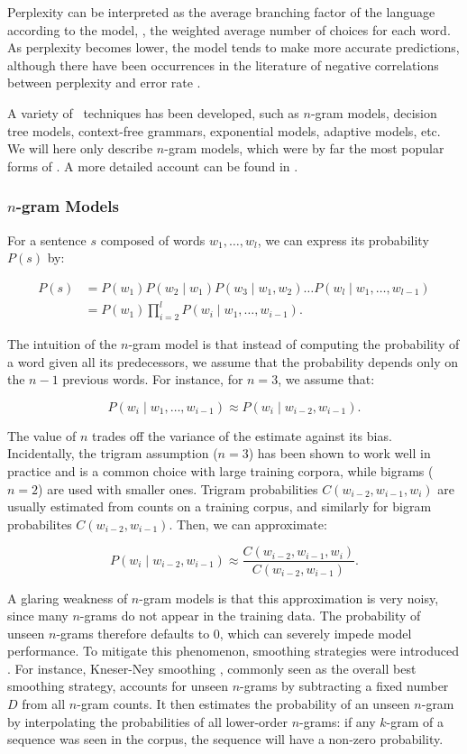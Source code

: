 Perplexity can be interpreted as the average branching factor of the language according to the model, \ie, the weighted average number of choices for each word. As perplexity becomes lower, the model tends to make more accurate predictions, although there have been occurrences in the literature of negative correlations between perplexity and error rate \citep{chen1998evaluation}.

A variety of \slm\ techniques has been developed, such as $n$-gram models, decision tree models, context-free grammars, exponential models, adaptive models, etc. We will here only describe $n$-gram models, which were by far the most popular forms of \slm . A more detailed account can be found in \citet{rosenfeld2000two}. 

\subsubsection{$n$-gram Models}
For a sentence $s$ composed of words $w_1, \dots, w_l$, we can express its probability $P(s)$ by:

\begin{align*}
    P(s)    & = P(w_1) P(w_2 \mid w_1) P(w_3 \mid w_1, w_2) \dots P(w_l \mid w_1, \dots, w_{l-1}) \\
            & = P(w_1) \prod_{i=2}^l P(w_i \mid w_1, \dots, w_{i-1}) .
\end{align*}

The intuition of the $n$-gram model is that instead of computing the probability of a word given all its predecessors, we assume that the probability depends only on the $n-1$ previous words. For instance, for $n=3$, we assume that:

\[ P(w_i \mid w_1, \dots, w_{i-1}) \approx P(w_i \mid w_{i-2}, w_{i-1}) . \]

The value of $n$ trades off the variance of the estimate against its bias. Incidentally, the trigram assumption ($n=3$) has been shown to work well in practice \citep{goodman2001bit} and is a common choice with large training corpora, while bigrams ($n=2$) are used with smaller ones. Trigram probabilities $C(w_{i-2}, w_{i-1}, w_i)$ are usually estimated from counts on a training corpus, and similarly for bigram probabilites $C(w_{i-2}, w_{i-1})$. Then, we can approximate:

\[ P(w_i \mid w_{i-2}, w_{i-1}) \approx \frac{C(w_{i-2}, w_{i-1}, w_i)}{C(w_{i-2}, w_{i-1})} . \]

A glaring weakness of $n$-gram models is that this approximation is very noisy, since many $n$-grams do not appear in the training data. The probability of unseen $n$-grams therefore defaults to 0, which can severely impede model performance. To mitigate this phenomenon, smoothing strategies were introduced \citep{chen2000survey}. For instance, Kneser-Ney smoothing \citep{kneser1995improved}, commonly seen as the overall best smoothing strategy, accounts for unseen $n$-grams by subtracting a fixed number $D$ from all $n$-gram counts. It then estimates the probability of an unseen $n$-gram by interpolating the probabilities of all lower-order $n$-grams: if any $k$-gram of a sequence was seen in the corpus, the sequence will have a non-zero probability.

